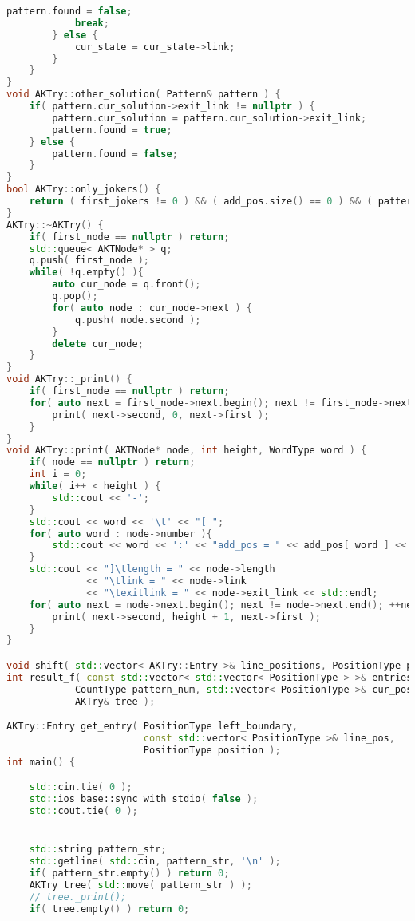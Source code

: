 \begin{lstlisting}[language=C++]
            pattern.found = false;
            break;
        } else {
            cur_state = cur_state->link;
        }
    }
}
void AKTry::other_solution( Pattern& pattern ) {
    if( pattern.cur_solution->exit_link != nullptr ) {
        pattern.cur_solution = pattern.cur_solution->exit_link;
        pattern.found = true;
    } else {
        pattern.found = false;
    }
}
bool AKTry::only_jokers() {
    return ( first_jokers != 0 ) && ( add_pos.size() == 0 ) && ( patterns_count == 0 );
}
AKTry::~AKTry() {
    if( first_node == nullptr ) return;
    std::queue< AKTNode* > q;
    q.push( first_node );
    while( !q.empty() ){
        auto cur_node = q.front();
        q.pop();
        for( auto node : cur_node->next ) {
            q.push( node.second );
        }
        delete cur_node;
    }
}
void AKTry::_print() {
    if( first_node == nullptr ) return;
    for( auto next = first_node->next.begin(); next != first_node->next.end(); ++next ) {
        print( next->second, 0, next->first );
    }
}
void AKTry::print( AKTNode* node, int height, WordType word ) {
    if( node == nullptr ) return;
    int i = 0;
    while( i++ < height ) {
        std::cout << '-';
    }
    std::cout << word << '\t' << "[ ";
    for( auto word : node->number ){
        std::cout << word << ':' << "add_pos = " << add_pos[ word ] << ";\t";
    }
    std::cout << "]\tlength = " << node->length
              << "\tlink = " << node->link
              << "\texitlink = " << node->exit_link << std::endl;
    for( auto next = node->next.begin(); next != node->next.end(); ++next ) {
        print( next->second, height + 1, next->first );
    }
}

void shift( std::vector< AKTry::Entry >& line_positions, PositionType position );
int result_f( const std::vector< std::vector< PositionType > >& entries,
            CountType pattern_num, std::vector< PositionType >& cur_positions,
            AKTry& tree );

AKTry::Entry get_entry( PositionType left_boundary,
                        const std::vector< PositionType >& line_pos,
                        PositionType position );
int main() {

    std::cin.tie( 0 );
    std::ios_base::sync_with_stdio( false );
    std::cout.tie( 0 );


    std::string pattern_str;
    std::getline( std::cin, pattern_str, '\n' );
    if( pattern_str.empty() ) return 0;
    AKTry tree( std::move( pattern_str ) );
    // tree._print();
    if( tree.empty() ) return 0;


\end{lstlisting}
